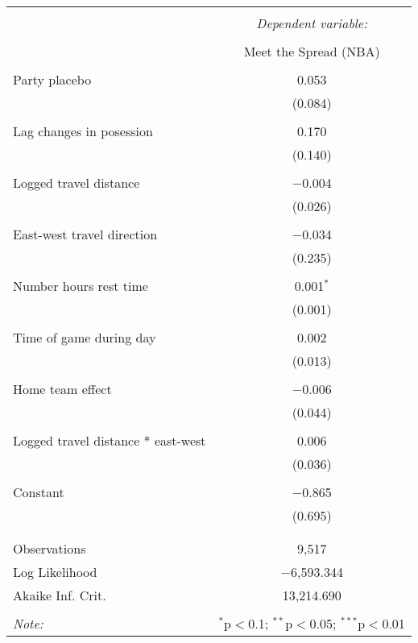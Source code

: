 \documentclass{beamer}
\begin{document}
\begin{frame}
{\begin{tabular}{@{\extracolsep{5pt}}lc}  \\[-1.8ex]\hline  \hline \\[-1.8ex]   & \multicolumn{1}{c}{\textit{Dependent variable:}} \\  \cline{2-2}  \\[-1.8ex] & Meet the Spread (NBA) \\  \hline \\[-1.8ex]   Party placebo & 0.053 \\    & (0.084) \\    & \\   Lag changes in posession & 0.170 \\    & (0.140) \\    & \\   Logged travel distance & $-$0.004 \\    & (0.026) \\    & \\   East-west travel direction & $-$0.034 \\    & (0.235) \\    & \\   Number hours rest time & 0.001$^{*}$ \\    & (0.001) \\    & \\   Time of game during day & 0.002 \\    & (0.013) \\    & \\   Home team effect & $-$0.006 \\    & (0.044) \\    & \\   Logged travel distance * east-west & 0.006 \\    & (0.036) \\    & \\   Constant & $-$0.865 \\    & (0.695) \\    & \\  \hline \\[-1.8ex]  Observations & 9,517 \\  Log Likelihood & $-$6,593.344 \\  Akaike Inf. Crit. & 13,214.690 \\  \hline  \hline \\[-1.8ex]  \textit{Note:}  & \multicolumn{1}{r}{$^{*}$p$<$0.1; $^{**}$p$<$0.05; $^{***}$p$<$0.01} \\  \end{tabular} 
}
\end{frame}
\end{document}

